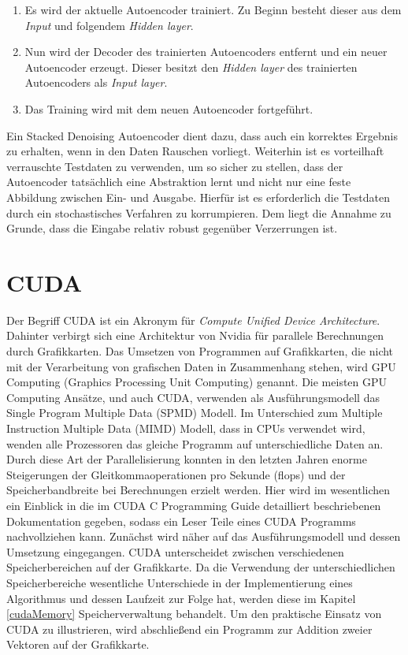 \begin{enumerate}
	\item Es wird der aktuelle Autoencoder trainiert. Zu Beginn besteht dieser aus dem \textit{Input} und folgendem \textit{Hidden layer}.
	\item Nun wird der Decoder des trainierten Autoencoders entfernt und ein neuer Autoencoder erzeugt. Dieser besitzt den \textit{Hidden layer} des trainierten Autoencoders als \textit{Input layer}.
	\item Das Training wird mit dem neuen Autoencoder fortgeführt.
\end{enumerate}

Ein Stacked Denoising Autoencoder \cite{sda2010} dient dazu, dass auch ein korrektes Ergebnis zu erhalten, wenn in den Daten Rauschen vorliegt. Weiterhin ist es vorteilhaft verrauschte Testdaten zu verwenden, um so sicher zu stellen, dass der Autoencoder tatsächlich eine Abstraktion lernt und nicht nur eine feste Abbildung zwischen Ein- und Ausgabe. Hierfür ist es erforderlich die Testdaten durch ein stochastisches Verfahren zu korrumpieren. Dem liegt die Annahme zu Grunde, dass die Eingabe relativ robust gegenüber Verzerrungen ist.

\section{CUDA}

Der Begriff CUDA ist ein Akronym für \textit{Compute Unified Device Architecture}. Dahinter verbirgt sich eine Architektur von Nvidia für parallele Berechnungen durch Grafikkarten. Das Umsetzen von Programmen auf Grafikkarten, die nicht mit der Verarbeitung von grafischen Daten in Zusammenhang stehen, wird GPU Computing (Graphics Processing Unit Computing) genannt. Die meisten GPU Computing Ansätze, und auch CUDA, verwenden als Ausführungsmodell das Single Program Multiple Data (SPMD) Modell. Im Unterschied zum Multiple Instruction Multiple Data (MIMD) Modell, dass in CPUs verwendet wird, wenden alle Prozessoren das gleiche Programm auf unterschiedliche Daten an. Durch diese Art der Parallelisierung konnten in den letzten Jahren enorme Steigerungen der Gleitkommaoperationen pro Sekunde (flops) und der Speicherbandbreite bei Berechnungen erzielt werden. 
Hier wird im wesentlichen ein Einblick in die im CUDA C Programming Guide \cite{cud2012} detailliert beschriebenen Dokumentation gegeben, sodass ein Leser Teile eines CUDA Programms nachvollziehen kann. Zunächst wird näher auf das Ausführungsmodell und dessen Umsetzung eingegangen. CUDA unterscheidet zwischen verschiedenen Speicherbereichen auf der Grafikkarte. Da die Verwendung der unterschiedlichen Speicherbereiche wesentliche Unterschiede in der Implementierung eines Algorithmus und dessen Laufzeit zur Folge hat, werden diese im Kapitel \ref{cudaMemory} Speicherverwaltung behandelt. Um den praktische Einsatz von CUDA zu illustrieren, wird abschließend ein Programm zur Addition zweier Vektoren auf der Grafikkarte.

